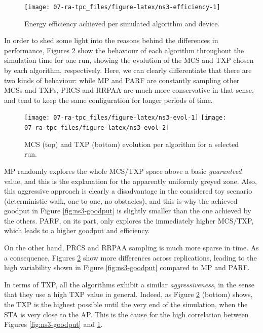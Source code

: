 \documentclass[twoside,nohyper]{tufte-book}
\theoremstyle{definition}
\theoremstyle{definition}
\theoremstyle{definition}
\theoremstyle{remark}
\begin{document}
\begin{figure}

{\centering \texttt{[image: 07-ra-tpc\_files/figure-latex/ns3-efficiency-1]} 

}

\caption[Energy efficiency achieved per simulated algorithm
and device.]{Energy efficiency achieved per simulated algorithm
and device.}\label{fig:ns3-efficiency}
\end{figure}

In order to shed some light into the reasons behind the differences in
performance, Figures \ref{fig:ns3-evol} show the behaviour of each
algorithm throughout the simulation time for one run, showing the
evolution of the MCS and TXP chosen by each algorithm, respectively.
Here, we can clearly differentiate that there are two kinds of
behaviour: while MP and PARF are constantly sampling other MCSs and
TXPs, PRCS and RRPAA are much more conservative in that sense, and tend
to keep the same configuration for longer periods of time.




\begin{figure}

{\centering \texttt{[image: 07-ra-tpc\_files/figure-latex/ns3-evol-1]} \texttt{[image: 07-ra-tpc\_files/figure-latex/ns3-evol-2]} 

}

\caption[MCS (top) and TXP (bottom) evolution per algorithm for a
selected run.]{MCS (top) and TXP (bottom) evolution per algorithm for a
selected run.}\label{fig:ns3-evol}
\end{figure}

MP randomly explores the whole MCS/TXP space above a basic
\emph{guaranteed} value, and this is the explanation for the apparently
uniformly greyed zone. Also, this aggressive approach is clearly a
disadvantage in the considered toy scenario (deterministic walk,
one-to-one, no obstacles), and this is why the achieved goodput in
Figure \ref{fig:ns3-goodput} is slightly smaller than the one achieved
by the others. PARF, on its part, only explores the immediately higher
MCS/TXP, which leads to a higher goodput and efficiency.

On the other hand, PRCS and RRPAA sampling is much more sparse in time.
As a consequence, Figures \ref{fig:ns3-evol} show more differences
across replications, leading to the high variability shown in Figure
\ref{fig:ns3-goodput} compared to MP and PARF.

In terms of TXP, all the algorithms exhibit a similar
\emph{aggressiveness}, in the sense that they use a high TXP value in
general. Indeed, as Figure \ref{fig:ns3-evol} (bottom) shows, the TXP is
the highest possible until the very end of the simulation, when the STA
is very close to the AP. This is the cause for the high correlation
between Figures \ref{fig:ns3-goodput} and \ref{fig:ns3-efficiency}.
\end{document}
